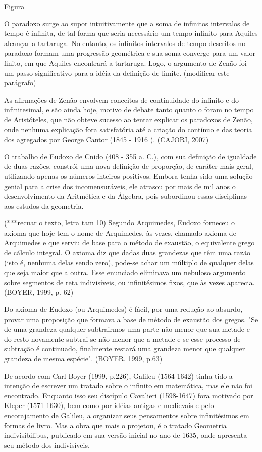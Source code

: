 \documentclass{article}
\begin{document}
\medskip
 Figura

\medskip
 O paradoxo surge ao supor intuitivamente que a soma de infinitos intervalos de tempo é infinita, de tal forma que seria necessário um tempo infinito para Aquiles alcançar a tartaruga.  No entanto, os infinitos intervalos de tempo descritos no paradoxo formam uma progressão geométrica e sua soma converge para um valor finito, em que Aquiles encontrará a tartaruga. Logo, o argumento de Zenão foi um passo significativo para a idéia da definição de limite. (modificar este parágrafo)
 
\medskip
 As afirmações de Zenão
envolvem conceitos de continuidade do infinito e do infinitesimal, e
são ainda hoje, motivo de debate tanto quanto o foram no tempo de
Aristóteles, que não obteve sucesso ao tentar explicar os paradoxos
de Zenão, onde nenhuma explicação fora satisfatória até a criação do
contínuo e das teoria dos agregados por George Cantor (1845 - 1916
). (CAJORI, 2007)

\medskip
O trabalho de Eudoxo de Cnido (408 - 355 a. C.), com sua definição
de igualdade de duas razões, constrói uma nova definição de
proporção, de caráter mais geral, utilizando apenas os números
inteiros positivos. Embora tenha sido uma solução genial para a
crise dos incomensuráveis, ele atrasou por mais de mil anos o
desenvolvimento da Aritmética e da Álgebra, pois subordinou essas
disciplinas aos estudos da geometria.

\medskip
(***recuar o texto, letra tam 10)
Segundo Arquimedes, Eudoxo forneceu o axioma que hoje tem o nome de Arquimedes, às
vezes, chamado axioma de Arquimedes e que serviu de base para o
método de exaustão, o equivalente grego de cálculo integral. O
axioma diz que dadas duas grandezas que têm uma razão (isto é,
nenhuma delas sendo zero), pode-se achar um múltiplo de qualquer
delas que seja maior que a outra. Esse enunciado eliminava um
nebuloso argumento sobre segmentos de reta indivisíveis, ou
infinitésimos fixos, que às vezes aparecia.(BOYER, 1999, p. 62)

\medskip
 Do axioma de Eudoxo
(ou Arquimedes) é fácil, por uma redução ao absurdo, provar uma
proposição que formava a base de método de exaustão dos gregos. "Se
de uma grandeza qualquer subtrairmos uma parte não menor que sua
metade e do resto novamente subtrai-se não menor que a metade e se
esse processo de subtração é continuado, finalmente restará uma
grandeza menor que qualquer grandeza de mesma espécie". (BOYER,
1999, p.63)

\medskip
 De acordo com Carl Boyer (1999, p.226), Galileu (1564-1642)
tinha tido a intenção de escrever um tratado sobre o infinito em
matemática, mas ele não foi encontrado. Enquanto isso seu discípulo
Cavalieri (1598-1647) fora motivado por Kleper (1571-1630), bem como
por idéias antigas e medievais e pelo encorajamento de Galileu, a
organizar seus pensamentos sobre infinitésimos em formas de livro.
Mas a obra que mais o projetou, é o tratado Geometria
indivisibilibus, publicado em sua versão inicial no ano de 1635,
onde apresenta seu método dos indivisíveis.
\end{document}
